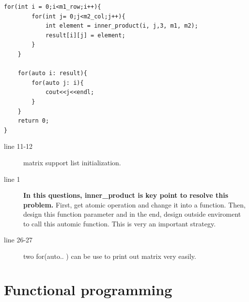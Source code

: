 \documentclass[a4paper,11pt,twoside]{book}
\begin{document}
\begin{itemize}
\begin{lstlisting}[]
	for(int i = 0;i<m1_row;i++){
		for(int j= 0;j<m2_col;j++){
			int element = inner_product(i, j,3, m1, m2); 
			result[i][j] = element;
		}
	}
	
	for(auto i: result){
		for(auto j: i){
			cout<<j<<endl;
		}
	}
	return 0;
}
\end{lstlisting}
	
	\begin{description}
		\item[line 11-12] matrix support list initialization.
		
		\item[line 1] \textbf{In this questions, inner\_product is key point to resolve this problem.} First, get atomic operation and change it into a function. Then, design this function parameter and in the end, design outside enviroment to call this automic function. This is very an important strategy. 
		
		\item[line 26-27] two for(auto.. ) can be use to print out matrix very easily.
	\end{description}
	
\end{itemize}


\chapter{Functional programming}
\end{document}
